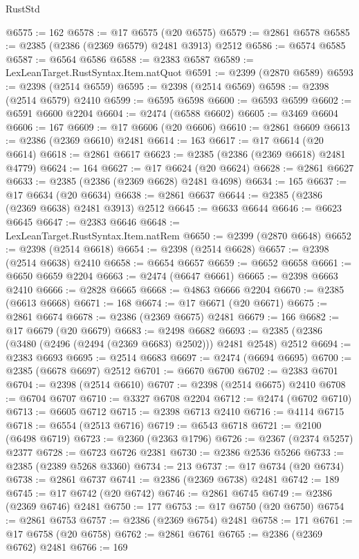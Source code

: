 \begin{lexlean}{RustStd}
\begin{coremodule}
@6575 := 162
@6578 := @17 @6575 (@20 @6575)
@6579 := @2861 @6578
@6585 := @2385 (@2386 (@2369 @6579) @2481 @3913) @2512
@6586 := @6574 @6585
@6587 := @6564 @6586
@6588 := @2383 @6587
@6589 := LexLeanTarget.RustSyntax.Item.natQuot
@6591 := @2399 (@2870 @6589)
@6593 := @2398 (@2514 @6559)
@6595 := @2398 (@2514 @6569)
@6598 := @2398 (@2514 @6579) @2410
@6599 := @6595 @6598
@6600 := @6593 @6599
@6602 := @6591 @6600 @2204
@6604 := @2474 (@6588 @6602)
@6605 := @3469 @6604
@6606 := 167
@6609 := @17 @6606 (@20 @6606)
@6610 := @2861 @6609
@6613 := @2386 (@2369 @6610) @2481
@6614 := 163
@6617 := @17 @6614 (@20 @6614)
@6618 := @2861 @6617
@6623 := @2385 (@2386 (@2369 @6618) @2481 @4779)
@6624 := 164
@6627 := @17 @6624 (@20 @6624)
@6628 := @2861 @6627
@6633 := @2385 (@2386 (@2369 @6628) @2481 @4698)
@6634 := 165
@6637 := @17 @6634 (@20 @6634)
@6638 := @2861 @6637
@6644 := @2385 (@2386 (@2369 @6638) @2481 @3913) @2512
@6645 := @6633 @6644
@6646 := @6623 @6645
@6647 := @2383 @6646
@6648 := LexLeanTarget.RustSyntax.Item.natRem
@6650 := @2399 (@2870 @6648)
@6652 := @2398 (@2514 @6618)
@6654 := @2398 (@2514 @6628)
@6657 := @2398 (@2514 @6638) @2410
@6658 := @6654 @6657
@6659 := @6652 @6658
@6661 := @6650 @6659 @2204
@6663 := @2474 (@6647 @6661)
@6665 := @2398 @6663 @2410
@6666 := @2828 @6665
@6668 := @4863 @6666 @2204
@6670 := @2385 (@6613 @6668)
@6671 := 168
@6674 := @17 @6671 (@20 @6671)
@6675 := @2861 @6674
@6678 := @2386 (@2369 @6675) @2481
@6679 := 166
@6682 := @17 @6679 (@20 @6679)
@6683 := @2498 @6682
@6693 := @2385 (@2386 (@3480 (@2496 (@2494 (@2369 @6683) @2502))) @2481 @2548) @2512
@6694 := @2383 @6693
@6695 := @2514 @6683
@6697 := @2474 (@6694 @6695)
@6700 := @2385 (@6678 @6697) @2512
@6701 := @6670 @6700
@6702 := @2383 @6701
@6704 := @2398 (@2514 @6610)
@6707 := @2398 (@2514 @6675) @2410
@6708 := @6704 @6707
@6710 := @3327 @6708 @2204
@6712 := @2474 (@6702 @6710)
@6713 := @6605 @6712
@6715 := @2398 @6713 @2410
@6716 := @4114 @6715
@6718 := @6554 (@2513 @6716)
@6719 := @6543 @6718
@6721 := @2100 (@6498 @6719)
@6723 := @2360 (@2363 @1796)
@6726 := @2367 (@2374 @5257) @2377
@6728 := @6723 @6726 @2381
@6730 := @2386 @2536 @5266
@6733 := @2385 (@2389 @5268 @3360)
@6734 := 213
@6737 := @17 @6734 (@20 @6734)
@6738 := @2861 @6737
@6741 := @2386 (@2369 @6738) @2481
@6742 := 189
@6745 := @17 @6742 (@20 @6742)
@6746 := @2861 @6745
@6749 := @2386 (@2369 @6746) @2481
@6750 := 177
@6753 := @17 @6750 (@20 @6750)
@6754 := @2861 @6753
@6757 := @2386 (@2369 @6754) @2481
@6758 := 171
@6761 := @17 @6758 (@20 @6758)
@6762 := @2861 @6761
@6765 := @2386 (@2369 @6762) @2481
@6766 := 169

\end{coremodule}
\end{lexlean}
